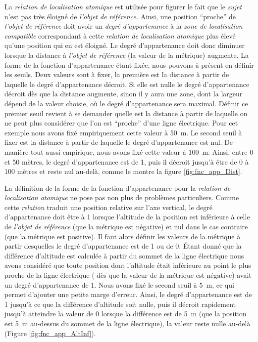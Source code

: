 La \emph{relation de localisation atomique}
est utilisée pour figurer le fait que le \emph{sujet} n'est pas très
éloigné de \emph{l'objet de référence.} Ainsi, une position
\enquote{proche} de \emph{l'objet de référence} doit avoir un
\emph{degré d'appartenance} à la \emph{zone de localisation
  compatible} correspondant à cette \emph{relation de localisation
  atomique} plus élevé qu'une position qui en est éloigné. Le degré
d'appartenance doit donc diminuer lorsque la distance à \emph{l'objet
  de référence} (\ie la valeur de la métrique) augmente. La forme de
la fonction d'appartenance étant fixée, nous pouvons à présent en
définir les seuils. Deux valeurs sont à fixer, la première est la
distance à partir de laquelle le degré d'appartenance décroit. Si elle
est nulle le degré d’appartenance décroit dès que la distance
augmente, sinon il y aura une zone, dont la largeur dépend de la
valeur choisie, où le degré d'appartenance sera maximal. Définir ce
premier seuil revient à se demander quelle est la distance à partir de
laquelle on ne peut plus considérer que l'on est \enquote{proche}
d'une ligne électrique. Pour cet exemple nous avons fixé empiriquement
cette valeur à \SI{50}{\meter}. Le second seuil à fixer est la
distance à partir de laquelle le degré d'appartenance est nul. De
manière tout aussi empirique, nous avons fixé cette valeur à
\SI{100}{\meter}. Ainsi, entre 0 et 50 mètres, le degré d'appartenance
est de 1, puis il décroit jusqu’à être de 0 à 100 mètres et reste nul
au-delà, comme le montre la figure \ref{fig:fnc_app_Dist}.

La définition de la forme de la fonction d'appartenance pour la
\emph{relation de localisation atomique}
 ne pose
pas non plus de problèmes particuliers. Comme cette \emph{relation}
traduit une position relative sur l'axe vertical, le degré
d'appartenance doit être à 1 lorsque l'altitude de la position est
inférieure à celle de \emph{l'objet de référence} (\ie que la métrique
est négative) et nul dans le cas contraire (\ie que la métrique est
positive). Il faut alors définir les valeurs de la métrique à partir
desquelles le degré d'appartenance est de 1 ou de 0. Étant donné que
la différence d'altitude est calculée à partir du sommet de la ligne
électrique nous avons considéré que toute position dont l'altitude
était inférieure au point le plus proche de la ligne électrique (\ie
dès que la valeur de la métrique est négative) avait un degré
d'appartenance de 1. Nous avons fixé le second seuil à \SI{5}{\meter},
ce qui permet d'ajouter une petite marge d'erreur. Ainsi, le degré
d'appartenance est de 1 jusqu’à ce que la différence d'altitude soit
nulle, puis il décroit rapidement jusqu'à atteindre la valeur de 0
lorsque la différence est de \SI{5}{\meter} (\ie que la position est
\SI{5}{\meter} au-dessus du sommet de la ligne électrique), la valeur
reste nulle au-delà (Figure \ref{fig:fnc_app_AltInf}).


